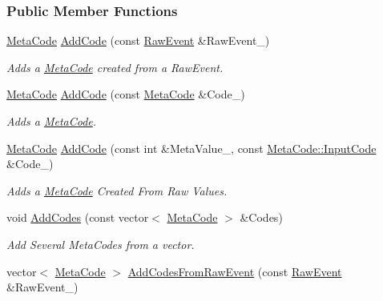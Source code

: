 \subsubsection*{Public Member Functions}
\begin{DoxyCompactItemize}
\item 
\hyperlink{classphys_1_1MetaCode}{MetaCode} \hyperlink{classphys_1_1EventUserInput_a1dd4a5a8021fd0e36fa394d0132e8f2c}{AddCode} (const \hyperlink{namespacephys_a8126d26e4507e66d09876988bb941fd4}{RawEvent} \&RawEvent\_\-)
\begin{DoxyCompactList}\small\item\em Adds a \hyperlink{classphys_1_1MetaCode}{MetaCode} created from a RawEvent. \item\end{DoxyCompactList}\item 
\hyperlink{classphys_1_1MetaCode}{MetaCode} \hyperlink{classphys_1_1EventUserInput_aa244b6b8a4b7dc930e25ef8b24af84f4}{AddCode} (const \hyperlink{classphys_1_1MetaCode}{MetaCode} \&Code\_\-)
\begin{DoxyCompactList}\small\item\em Adds a \hyperlink{classphys_1_1MetaCode}{MetaCode}. \item\end{DoxyCompactList}\item 
\hyperlink{classphys_1_1MetaCode}{MetaCode} \hyperlink{classphys_1_1EventUserInput_a9f87a9e6b57f8958945d4955922ebacd}{AddCode} (const int \&MetaValue\_\-, const \hyperlink{classphys_1_1MetaCode_a3e501cbb5bf0f6f1fdb7211465bda8d8}{MetaCode::InputCode} \&Code\_\-)
\begin{DoxyCompactList}\small\item\em Adds a \hyperlink{classphys_1_1MetaCode}{MetaCode} Created From Raw Values. \item\end{DoxyCompactList}\item 
void \hyperlink{classphys_1_1EventUserInput_a1da1fcba3c00346e00c1d4477cc3dbe9}{AddCodes} (const vector$<$ \hyperlink{classphys_1_1MetaCode}{MetaCode} $>$ \&Codes)
\begin{DoxyCompactList}\small\item\em Add Several MetaCodes from a vector. \item\end{DoxyCompactList}\item 
vector$<$ \hyperlink{classphys_1_1MetaCode}{MetaCode} $>$ \hyperlink{classphys_1_1EventUserInput_aa83cb95f719dbdceae282f0dc545aeb0}{AddCodesFromRawEvent} (const \hyperlink{namespacephys_a8126d26e4507e66d09876988bb941fd4}{RawEvent} \&RawEvent\_\-)

\end{DoxyCompactItemize}
